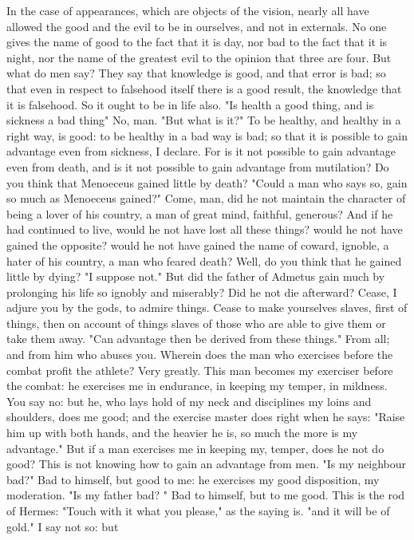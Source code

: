 \documentclass[a4paper]{article}
\begin{document}
    In the case of appearances, which are objects of the vision, nearly all
have allowed the good and the evil to be in ourselves, and not in externals. No
one gives the name of good to the fact that it is day, nor bad to the fact that
it is night, nor the name of the greatest evil to the opinion that three are
four. But what do men say? They say that knowledge is good, and that error is
bad; so that even in respect to falsehood itself there is a good result, the
knowledge that it is falsehood. So it ought to be in life also. "Is health a
good thing, and is sickness a bad thing" No, man. "But what is it?" To be
healthy, and healthy in a right way, is good: to be healthy in a bad way is
bad; so that it is possible to gain advantage even from sickness, I declare.
For is it not possible to gain advantage even from death, and is it not
possible to gain advantage from mutilation? Do you think that Menoeceus gained
little by death? "Could a man who says so, gain so much as Menoeceus gained?"
Come, man, did he not maintain the character of being a lover of his country, a
man of great mind, faithful, generous? And if he had continued to live, would
he not have lost all these things? would he not have gained the opposite? would
he not have gained the name of coward, ignoble, a hater of his country, a man
who feared death? Well, do you think that he gained little by dying? "I suppose
not." But did the father of Admetus gain much by prolonging his life so ignobly
and miserably? Did he not die afterward? Cease, I adjure you by the gods, to
admire things. Cease to make yourselves slaves, first of things, then on
account of things slaves of those who are able to give them or take them away.
    "Can advantage then be derived from these things." From all; and from him
who abuses you. Wherein does the man who exercises before the combat profit the
athlete? Very greatly. This man becomes my exerciser before the combat: he
exercises me in endurance, in keeping my temper, in mildness. You say no: but
he, who lays hold of my neck and disciplines my loins and shoulders, does me
good; and the exercise master does right when he says: "Raise him up with both
hands, and the heavier he is, so much the more is my advantage." But if a man
exercises me in keeping my, temper, does he not do good? This is not knowing
how to gain an advantage from men. "Is my neighbour bad?" Bad to himself, but
good to me: he exercises my good disposition, my moderation. "Is my father bad?
" Bad to himself, but to me good. This is the rod of Hermes: "Touch with it
what you please," as the saying is. "and it will be of gold." I say not so: but
\end{document}
